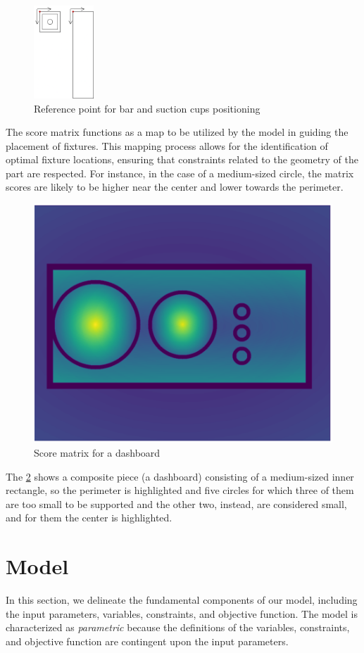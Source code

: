 \documentclass[runningheads]{llncs}
\begin{document}
\begin{figure}
	\centering
	\includegraphics[width=0.2\textwidth]{img/reference_point_bars_suction_cups}
	\caption{Reference point for bar and suction cups positioning}
	\label{fig:referencepointbarssuctioncups}
\end{figure}

The score matrix functions as a map to be utilized by the model in guiding the placement of fixtures. This mapping process allows for the identification of optimal fixture locations, ensuring that constraints related to the geometry of the part are respected. For instance, in the case of a medium-sized circle, the matrix scores are likely to be higher near the center and lower towards the perimeter.

\begin{figure}
	\centering
	\includegraphics[width=0.4\linewidth]{img/score_matrix_dashboard}
	\caption{Score matrix for a dashboard}
	\label{fig:scorematrixdashboard}
\end{figure}

The \cref{fig:scorematrixdashboard} shows a composite piece (a dashboard) consisting of a medium-sized inner rectangle, so the perimeter is highlighted and five circles for which three of them are too small to be supported and the other two, instead, are considered small, and for them the center is highlighted.


\section{Model}
In this section, we delineate the fundamental components of our model, including the input parameters, variables, constraints, and objective function. The model is characterized as \textit{parametric} because the definitions of the variables, constraints, and objective function are contingent upon the input parameters.
\end{document}

